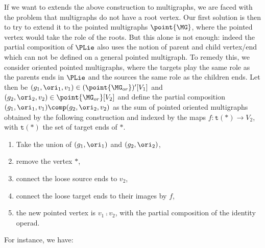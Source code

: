 If we want to extends the above construction to multigraphs, we are faced with the problem that multigraphs 
do not have a root vertex. Our first solution is then to try to extend it to the pointed multigraphs 
$\point{\MG}$, where the pointed vertex would take the role of the roots. But this alone is not enough: 
indeed the partial composition of $\PLie$ also uses the notion 
of parent and child vertex/end which can not be defined on a general pointed multigraph. To remedy this, we 
consider oriented pointed multigraphs, where the targets play the same role as the parents ends in $\PLie$ 
and the sources the same role as the children ends.
Let then be $(g_1, \ori_1, v_1) \in (\point{\MG_{or}})'[V_1]$ and $(g_2, \ori_2, v_2) \in\point{\MG_{or}}[V_2]$ and define 
the partial composition $(g_1,\ori_1,v_1)\comp (g_2,\ori_2,v_2)$ as the sum of pointed oriented multigraphs obtained by the 
following construction and indexed by the maps $f:\texttt{t}(\ast)\to V_2$, with $\texttt{t}(\ast)$ the set of target ends of $\ast$.
\begin{enumerate}
    \item Take the union of $(g_1,\ori_1)$ and $(g_2,\ori_2)$,

    \item remove the vertex $\ast$,

    \item connect the loose source ends to $v_2$,

    \item connect the loose target ends to their images by $f$,

    \item the new pointed vertex is $v_1\comp v_2$, with the partial composition of the identity operad.
\end{enumerate}
For instance, we have:

